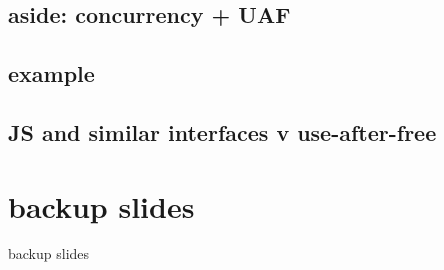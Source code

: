 \subsection{aside: concurrency + UAF}


\subsection{example}


\subsection{JS and similar interfaces v use-after-free}






\section{backup slides}
\begin{frame}{backup slides}
\end{frame}



